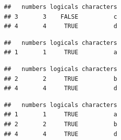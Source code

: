 \documentclass[]{book}
\newenvironment{Shaded}{\begin{snugshade}}{\end{snugshade}}
\newcommand{\DecValTok}[1]{\textcolor[rgb]{0.00,0.00,0.81}{#1}}
\newcommand{\KeywordTok}[1]{\textcolor[rgb]{0.13,0.29,0.53}{\textbf{#1}}}
\newcommand{\NormalTok}[1]{#1}
\newcommand{\OperatorTok}[1]{\textcolor[rgb]{0.81,0.36,0.00}{\textbf{#1}}}
\newcommand{\OtherTok}[1]{\textcolor[rgb]{0.56,0.35,0.01}{#1}}
\newcommand{\StringTok}[1]{\textcolor[rgb]{0.31,0.60,0.02}{#1}}
\begin{document}
\begin{verbatim}
##   numbers logicals characters
## 3       3    FALSE          c
## 4       4     TRUE          d
\end{verbatim}

\begin{Shaded}
\end{Shaded}

\begin{verbatim}
##   numbers logicals characters
## 1       1     TRUE          a
\end{verbatim}

\begin{Shaded}
\end{Shaded}

\begin{verbatim}
##   numbers logicals characters
## 2       2     TRUE          b
## 4       4     TRUE          d
\end{verbatim}

\begin{Shaded}
\end{Shaded}

\begin{verbatim}
##   numbers logicals characters
## 1       1     TRUE          a
## 2       2     TRUE          b
## 4       4     TRUE          d
\end{verbatim}
\end{document}
